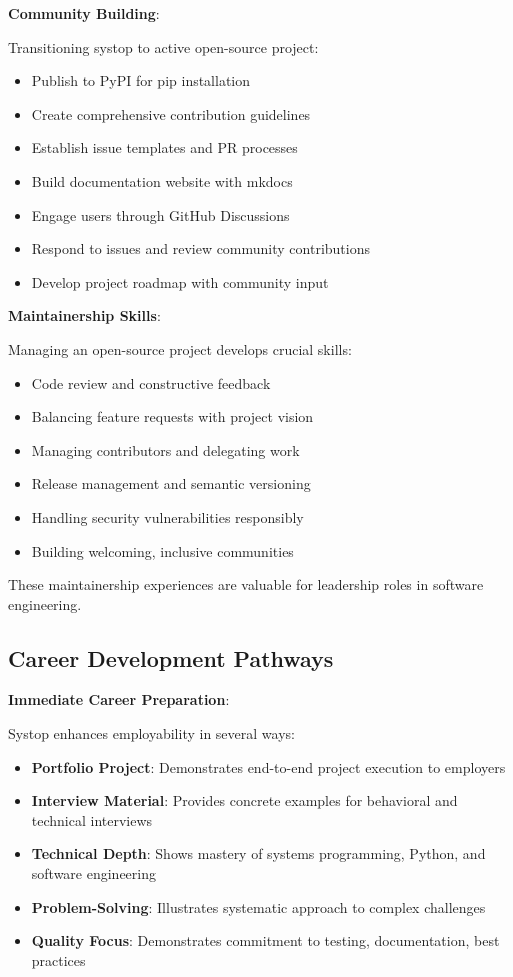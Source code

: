 \documentclass[12pt,a4paper,oneside]{report}
\begin{document}
\textbf{Community Building}:

Transitioning systop to active open-source project:

\begin{itemize}
    \item Publish to PyPI for pip installation
    \item Create comprehensive contribution guidelines
    \item Establish issue templates and PR processes
    \item Build documentation website with mkdocs
    \item Engage users through GitHub Discussions
    \item Respond to issues and review community contributions
    \item Develop project roadmap with community input
\end{itemize}

\textbf{Maintainership Skills}:

Managing an open-source project develops crucial skills:
\begin{itemize}
    \item Code review and constructive feedback
    \item Balancing feature requests with project vision
    \item Managing contributors and delegating work
    \item Release management and semantic versioning
    \item Handling security vulnerabilities responsibly
    \item Building welcoming, inclusive communities
\end{itemize}

These maintainership experiences are valuable for leadership roles in software engineering.

\subsection{Career Development Pathways}

\textbf{Immediate Career Preparation}:

Systop enhances employability in several ways:

\begin{itemize}
    \item \textbf{Portfolio Project}: Demonstrates end-to-end project execution to employers
    \item \textbf{Interview Material}: Provides concrete examples for behavioral and technical interviews
    \item \textbf{Technical Depth}: Shows mastery of systems programming, Python, and software engineering
    \item \textbf{Problem-Solving}: Illustrates systematic approach to complex challenges
    \item \textbf{Quality Focus}: Demonstrates commitment to testing, documentation, best practices
\end{itemize}
\end{document}

